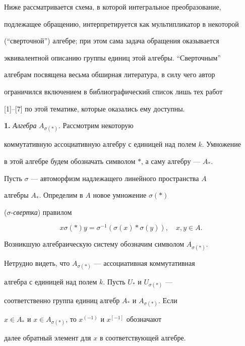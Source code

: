 \label{begin}  


 


Ниже рассматривается схема, в которой интегральное преобразование, 


подлежащее обращению, интерпретируется как мультипликатор в некоторой 


(``сверточной'') алгебре; при этом сама задача обращения оказывается 


эквивалентной описанию группы единиц этой алгебры. ``Сверточным'' 


алгебрам посвящена весьма обширная литература, в силу чего автор 


ограничился включением в библиографический список лишь тех работ 


[1]--[7] по этой тематике, которые оказались ему доступны. 


\medskip 


 


{\bf 1.} {\it Алгебра} $A_{\sigma(*)}$. Рассмотрим некоторую 


коммутативную ассоциативную алгебру с единицей над полем $k$. Умножение 


в этой алгебре будем обозначать символом $*$, а саму алгебру --- $A_*$. 


Пусть $\sigma$ --- автоморфизм надлежащего линейного пространства $A$ 


алгебры $A_*$. Определим в $A$ новое умножение $\sigma(*)$ 


($\sigma$-{\it свертка}) правилом 


\begin{equation} 


x\sigma(*)y=\sigma^{-1}(\sigma(x)*\sigma(y)),\quad x,y\in A. 


\end{equation} 


Возникшую алгебраическую систему обозначим символом $A_{\sigma(*)}$. 


Нетрудно видеть, что $A_{\sigma(*)}$ --- ассоциативная коммутативная 


алгебра с единицей над полем $k$. Пусть $U_*$ и $U_{\sigma(*)}$ --- 


соответственно группа единиц алгебр $A_*$ и $A_{\sigma(*)}$. Если 


$x\in A_*$ и $x\in A_{\sigma(*)}$, то $x^{(-1)}$ и $x^{[-1]}$ обозначают 


далее обратный элемент для $x$ в соответствующей алгебре. 


